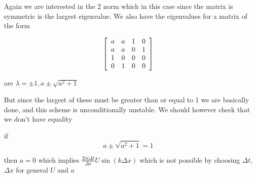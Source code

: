 \documentclass[12pt]{article}
\begin{document}
Again we are interested in the 2 norm which in this case since the matrix is symmetric is the largest eigenvalue. We also have the eigenvalues for a matrix of the form

\[\left[\begin{array}{c c c c}
a &a& 1 & 0 \\
a & a & 0 & 1 \\
1&0&0&0 \\
0&1&0&0 \\
\end{array} \right]\]

are $\lambda = \pm 1 , a \pm \sqrt{a^2 + 1}$

But since the largest of these must be greater than or equal to 1 we are basically done, and this scheme is unconditionally unstable. We should however check that we don't have equality

if
\[ a \pm \sqrt{a^2 + 1} = 1\]

then $a = 0$
which implies $\frac{2ia\Delta t}{\Delta x}U\sin\left(k\Delta x\right)$ which is not possible by choosing $\Delta t$, $\Delta x$ for general $U$ and $a$
 
\end{document}

